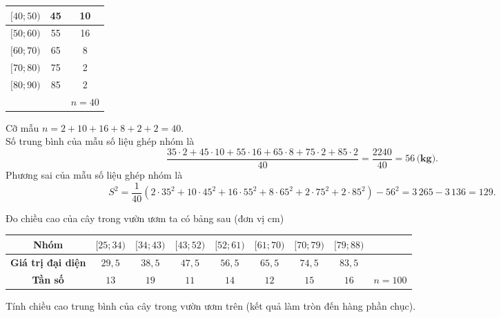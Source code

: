 \begin{ex}
{\begin{itemchoice}
\begin{center}
\begin{tabular}{|c|c|c|}
					\hline
					$[40; 50)$ & 45 & 10 \\
					\hline
					$[50; 60)$ & 55 & 16 \\
					\hline
					$[60; 70)$ & 65 & 8 \\
					\hline
					$[70; 80)$ & 75 & 2 \\
					\hline
					$[80; 90)$ & 85 & 2 \\
					\hline
					& & $n=40$ \\
					\hline
				\end{tabular}
			\end{center}				
			Cỡ mẫu $n=2+10+16+8+2+2=40$.\\
			Số trung bình của mẫu số liệu ghép nhóm là
			$$
			\dfrac{35\cdot 2+45\cdot 10+55\cdot 16+65\cdot 8+75\cdot 2+85\cdot 2}{40}=\dfrac{2240}{40}=56\, \textbf{(kg).}
			$$ 
			Phương sai của mẫu số liệu ghép nhóm là
			$$ S^2=\dfrac{1}{40}\left(2\cdot 35^2+10\cdot 45^2+16\cdot 55^2+8\cdot 65^2+2\cdot 75^2+2\cdot 85^2\right)-56^2=3\,265-3\,136=129.
			$$
		\end{itemchoice}
	}
\end{ex}

\begin{bt}%
Đo chiều cao của cây trong vườn ươm ta có bảng sau (đơn vị cm)
\begin{center}
\begin{tabular}{|c|c|c|c|c|c|c|c|c|}
\hline
\textbf{Nhóm} & $[25;34)$ & $[34;43)$ & $[43;52)$ & $[52;61)$ & $[61;70)$ & $[70;79)$ & $[79;88)$ & \\
\hline
\textbf{Giá trị đại diện} & $29{,}5$ & $38{,}5$ & $47{,}5$ & $56{,}5$ & $65{,}5$ & $74{,}5$ & $83{,}5$ & \\
\hline
\textbf{Tần số} & $13$ & $19$ & $11$ & $14$ & $12$ & $15$ & $16$ & $n=100$\\
\hline
\end{tabular}
\end{center}
Tính chiều cao trung bình của cây trong vườn ươm trên (kết quả làm tròn đến hàng phần chục).
\end{bt}

